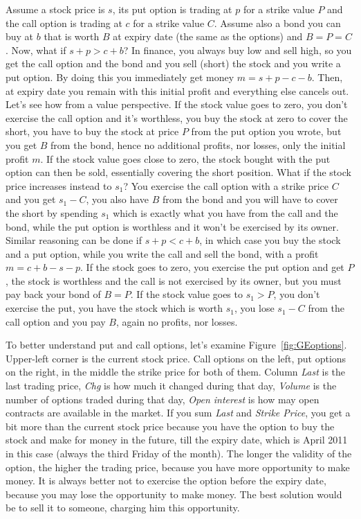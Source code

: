 Assume a stock price is $s$, its put option is trading at $p$ for a strike value $P$ and the call option is trading at $c$ for a strike value $C$. Assume also a bond you can buy at $b$ that is worth $B$ at expiry date (the same as the options) and $B = P = C$.
Now, what if $s + p > c + b$? In finance, you always buy low and sell high, so you get the call option and the bond and you sell (short) the stock and you write a put option. By doing this you immediately get money $m = s + p - c - b$. Then, at expiry date you remain with this initial profit and everything else cancels out. Let's see how from a value perspective. If the stock value goes to zero, you don't exercise the call option and it's worthless, you buy the stock at zero to cover the short, you have to buy the stock at price $P$ from the put option you wrote, but you get $B$ from the bond, hence no additional profits, nor losses, only the initial profit $m$. If the stock value goes close to zero, the stock bought with the put option can then be sold, essentially covering the short position. What if the stock price increases instead to $s_1$? You exercise the call option with a strike price $C$ and you get $s_1 - C$, you also have $B$ from the bond and you will have to cover the short by spending $s_1$ which is exactly what you have from the call and the bond,  while the put option is worthless and it won't be exercised by its owner. Similar reasoning can be done if $s + p < c + b$, in which case you buy the stock and a put option, while you write the call and sell the bond, with a profit $m = c + b - s - p$. If the stock goes to zero, you exercise the put option and get $P$, the stock is worthless and the call is not exercised by its owner, but you must pay back your bond of $B=P$. If the stock value goes to $s_1 > P$, you don't exercise the put, you have the stock which is worth $s_1$, you lose $s_1 - C$ from the call option and you pay $B$, again no profits, nor losses.

To better understand put and call options, let's examine Figure~\ref{fig:GEoptions}. Upper-left corner is the current stock price. Call options on the left, put options on the right, in the middle the strike price for both of them. Column \textit{Last} is the last trading price, \textit{Chg} is how much it changed during that day, \textit{Volume} is the number of options traded during that day, \textit{Open interest} is how may open contracts are available in the market. If you sum \textit{Last} and \textit{Strike Price}, you get a bit more than the current stock price because you have the option to buy the stock and make for money in the future, till the expiry date, which is April 2011 in this case (always the third Friday of the month). The longer the validity of the option, the higher the trading price, because you have more opportunity to make money. It is always better not to exercise the option before the expiry date, because you may lose the opportunity to make money. The best solution would be to sell it to someone, charging him this opportunity.

